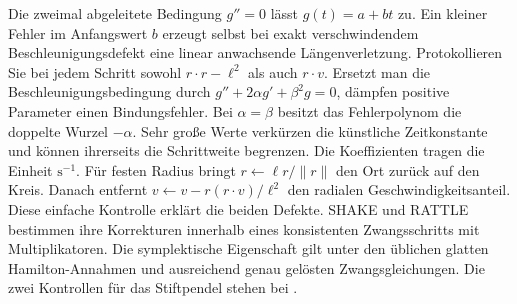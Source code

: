 \hypertarget{punkt4-3-1}{}
Die zweimal abgeleitete Bedingung \(g''=0\) lässt \(g(t)=a+bt\) zu. Ein kleiner Fehler im Anfangswert \(b\) erzeugt selbst bei exakt verschwindendem Beschleunigungsdefekt eine linear anwachsende Längenverletzung. Protokollieren Sie bei jedem Schritt sowohl \(r\cdot r-\ell^2\) als auch \(r\cdot v\).
\hypertarget{punkt4-3-2}{}
Ersetzt man die Beschleunigungsbedingung durch \(g''+2\alpha g'+\beta^2g=0\), dämpfen positive Parameter einen Bindungsfehler. Bei \(\alpha=\beta\) besitzt das Fehlerpolynom die doppelte Wurzel \(-\alpha\). Sehr große Werte verkürzen die künstliche Zeitkonstante und können ihrerseits die Schrittweite begrenzen. Die Koeffizienten tragen die Einheit \(\mathrm{s}^{-1}\).
\hypertarget{punkt4-3-3}{}
Für festen Radius bringt \(r\leftarrow\ell r/\|r\|\) den Ort zurück auf den Kreis. Danach entfernt \(v\leftarrow v-r(r\cdot v)/\ell^2\) den radialen Geschwindigkeitsanteil. Diese einfache Kontrolle erklärt die beiden Defekte. SHAKE und RATTLE bestimmen ihre Korrekturen innerhalb eines konsistenten Zwangsschritts mit Multiplikatoren. Die symplektische Eigenschaft gilt unter den üblichen glatten Hamilton-Annahmen und ausreichend genau gelösten Zwangsgleichungen. Die zwei Kontrollen für das Stiftpendel stehen bei .


